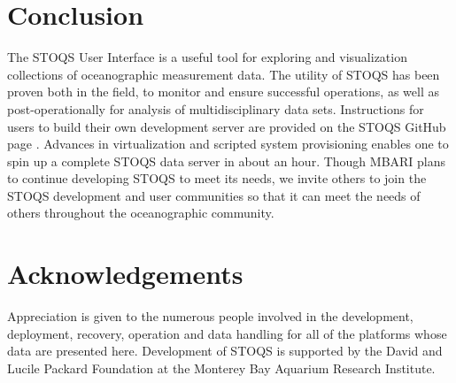 \documentclass[conference]{IEEEtran}
\begin{document}
\section{Conclusion}
The STOQS User Interface is a useful tool for exploring and visualization 
collections  of oceanographic measurement data.  
The utility of STOQS has been proven both in 
the field, to monitor and ensure successful operations, as well as 
post-operationally for analysis of multidisciplinary data sets.
Instructions for users to build their own development server are provided
on the STOQS GitHub page \cite{stoqs_github}. Advances in virtualization and scripted system
provisioning enables one to spin up a complete STOQS data server in about 
an hour. Though MBARI plans to continue developing STOQS to meet its needs, we
invite others to join the STOQS development and user communities so that it
can meet the needs of others throughout the oceanographic community.




\section*{Acknowledgements}

Appreciation is given to the numerous people involved in the development, 
deployment, recovery, operation and data handling for all of the platforms 
whose data are presented here. Development of STOQS is supported by the 
David and Lucile Packard Foundation at the Monterey Bay Aquarium Research Institute.








%




\end{document}
